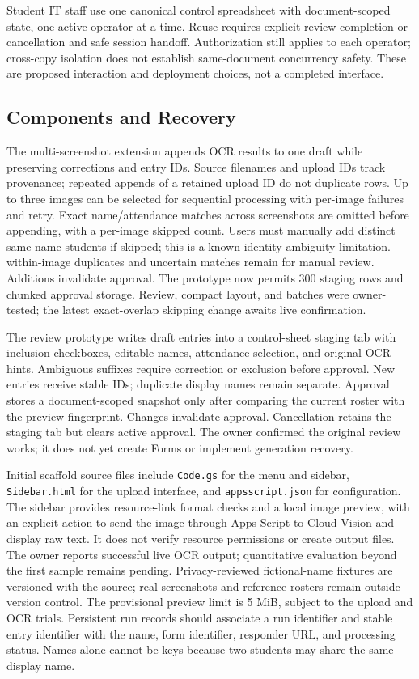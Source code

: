 Student IT staff use one canonical control spreadsheet with document-scoped
state, one active operator at a time. Reuse requires explicit review completion
or cancellation and safe session handoff. Authorization still applies to each
operator; cross-copy isolation does not establish same-document concurrency safety.
These are proposed interaction and deployment choices, not a completed interface.

\subsection{Components and Recovery}
The multi-screenshot extension appends OCR results to one draft while preserving
corrections and entry IDs. Source filenames and upload IDs track provenance;
repeated appends of a retained upload ID do not duplicate rows. Up to three images
can be selected for sequential processing with per-image failures and retry.
Exact name/attendance matches across screenshots are omitted before appending,
with a per-image skipped count. Users must manually add distinct same-name students
if skipped; this is a known identity-ambiguity limitation.
within-image duplicates and uncertain matches remain for manual review. Additions
invalidate approval. The prototype now permits 300 staging rows and chunked
approval storage. Review, compact layout, and batches were owner-tested; the
latest exact-overlap skipping change awaits live confirmation.

The review prototype writes draft entries into a control-sheet staging tab with
inclusion checkboxes, editable names, attendance selection, and original OCR hints.
Ambiguous suffixes require correction or exclusion before approval. New entries
receive stable IDs; duplicate display names remain separate. Approval stores a
document-scoped snapshot only after comparing the current roster with the preview
fingerprint. Changes invalidate approval. Cancellation retains the staging tab
but clears active approval. The owner confirmed the original review works; it does
not yet create Forms or implement generation recovery.

Initial scaffold source files include \texttt{Code.gs} for the menu and sidebar,
\texttt{Sidebar.html} for the upload interface, and \texttt{appsscript.json}
for configuration. The sidebar provides resource-link format checks and a local
image preview, with an explicit action to send the image through Apps Script to
Cloud Vision and display raw text. It does not verify resource permissions or
create output files. The owner reports successful live OCR output; quantitative
evaluation beyond the first sample remains pending. Privacy-reviewed fictional-name
fixtures are versioned with the source; real screenshots and reference rosters
remain outside version control. The provisional preview limit is 5 MiB, subject
to the upload and OCR trials.
Persistent run records should associate a run identifier and stable entry
identifier with the name, form identifier, responder URL, and processing status.
Names alone cannot be keys because two students may share the same display name.

